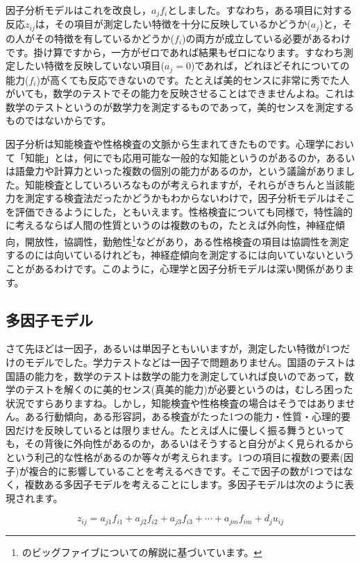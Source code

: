 \documentclass{ltjsbook}
\begin{document}
因子分析モデルはこれを改良し，$a_j f_i$としました。すなわち，ある項目に対する反応$z_{ij}$は，その項目が測定したい特徴を十分に反映しているかどうか($a_j$)と，その人がその特徴を有しているかどうか($f_i$)の両方が成立している必要があるわけです。掛け算ですから，一方がゼロであれば結果もゼロになります。すなわち測定したい特徴を反映していない項目($a_j=0$)であれば，どれほどそれについての能力($f_i$)が高くても反応できないのです。たとえば美的センスに非常に秀でた人がいても，数学のテストでその能力を反映させることはできませんよね。これは数学のテストというのが数学力を測定するものであって，美的センスを測定するものではないからです。

因子分析は知能検査や性格検査の文脈から生まれてきたものです。心理学において「知能」とは，何にでも応用可能な一般的な知能というのがあるのか，あるいは語彙力や計算力といった複数の個別の能力があるのか，という議論がありました。知能検査としていろいろなものが考えられますが，それらがきちんと当該能力を測定する検査法だったかどうかもわからないわけで，因子分析モデルはそこを評価できるようにした，ともいえます。性格検査についても同様で，特性論的に考えるならば人間の性質というのは複数のもの，たとえば外向性，神経症傾向，開放性，協調性，勤勉性\footnote{\textcite{Oshio2020}のビッグファイブについての解説に基づいています。}などがあり，ある性格検査の項目は協調性を測定するのには向いているけれども，神経症傾向を測定するには向いていないということがあるわけです。このように，心理学と因子分析モデルは深い関係があります。

\subsection{多因子モデル}
さて先ほどは一因子，あるいは単因子ともいいますが，測定したい特徴が1つだけのモデルでした。学力テストなどは一因子で問題ありません。国語のテストは国語の能力を，数学のテストは数学の能力を測定していれば良いのであって，数学のテストを解くのに美的センス(真美的能力)が必要というのは，むしろ困った状況ですらありますね。しかし，知能検査や性格検査の場合はそうではありません。ある行動傾向，ある形容詞，ある検査がたった1つの能力・性質・心理的要因だけを反映しているとは限りません。たとえば人に優しく振る舞うといっても，その背後に外向性があるのか，あるいはそうすると自分がよく見られるからという利己的な性格があるのか等々が考えられます。1つの項目に複数の要素(因子)が複合的に影響していることを考えるべきです。そこで因子の数が1つではなく，複数ある多因子モデルを考えることにします。多因子モデルは次のように表現されます。

\begin{equation}
	z_{ij} = a_{j1}f_{i1} + a_{j2}f_{i2}+a_{j3}f_{i3} + \cdots + a_{jm}f_{im} + d_j u_{ij}
	\label{factor}
\end{equation}
\end{document}
